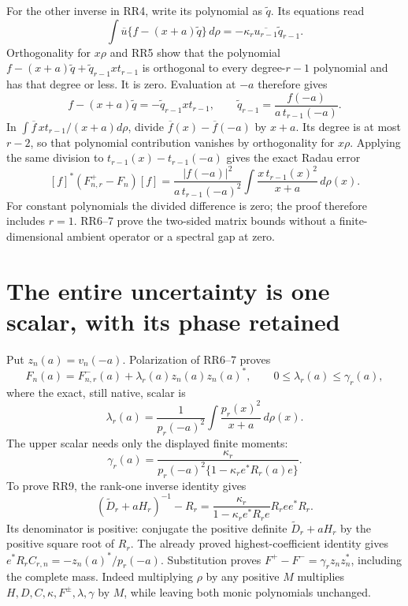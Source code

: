 \documentclass[11pt]{article}
\begin{document}
For the other inverse in RR4, write its polynomial as $\widetilde q$.
Its equations read
\[
 \int\overline u\{f-(x+a)\widetilde q\}\,d\rho
       =-\kappa_r\overline{u_{r-1}}\widetilde q_{r-1}.
\]
Orthogonality for $x\rho$ and RR5 show that the polynomial
$f-(x+a)\widetilde q+\widetilde q_{r-1}xt_{r-1}$ is orthogonal
to every degree-$r-1$ polynomial and has that degree or less.
It is zero. Evaluation at $-a$ therefore gives
\[
 f-(x+a)\widetilde q=-\widetilde q_{r-1}xt_{r-1},
 \qquad\widetilde q_{r-1}=\frac{f(-a)}{a\,t_{r-1}(-a)}.
\]
In $\int \overline f\,xt_{r-1}/(x+a)d\rho$, divide
$\overline f(x)-\overline f(-a)$ by $x+a$. Its degree is at
most $r-2$, so that polynomial contribution vanishes by
orthogonality for $x\rho$. Applying the same division to
$t_{r-1}(x)-t_{r-1}(-a)$ gives the exact Radau error
\begin{equation}\tag{RR7}\label{eq:RadauError}
 [f]^*(F^+_{n,r}-F_n)[f]
 =\frac{|f(-a)|^2}{a\,t_{r-1}(-a)^2}
               \int\frac{x\,t_{r-1}(x)^2}{x+a}\,d\rho(x).
\end{equation}
For constant polynomials the divided difference is zero; the proof
therefore includes $r=1$. RR6--7 prove the two-sided matrix bounds
without a finite-dimensional ambient operator or a spectral gap at zero.

\section{The entire uncertainty is one scalar, with its phase retained}
Put $z_n(a)=v_n(-a)$. Polarization of RR6--7 proves
\begin{equation}\tag{RR8}\label{eq:rankone}
 F_n(a)=F^-_{n,r}(a)+\lambda_r(a)z_n(a)z_n(a)^*,
 \qquad 0\le\lambda_r(a)\le\gamma_r(a),
\end{equation}
where the exact, still native, scalar is
\[
 \lambda_r(a)=\frac1{p_r(-a)^2}
                 \int\frac{p_r(x)^2}{x+a}\,d\rho(x).
\]
The upper scalar needs only the displayed finite moments:
\begin{equation}\tag{RR9}\label{eq:gamma}
 \gamma_r(a)=\frac{\kappa_r}
 {p_r(-a)^2\{1-\kappa_r e^*R_r(a)e\}}.
\end{equation}
To prove RR9, the rank-one inverse identity gives
\[
 (\widetilde D_r+aH_r)^{-1}-R_r
 =\frac{\kappa_r}{1-\kappa_r e^*R_re}R_ree^*R_r.
\]
Its denominator is positive: conjugate the positive definite
$\widetilde D_r+aH_r$ by the positive square root of $R_r$.
The already proved highest-coefficient identity gives
$e^*R_rC_{r,n}=-z_n(a)^*/p_r(-a)$.
Substitution proves $F^+-F^-=\gamma_rz_nz_n^*$, including the
complete mass. Indeed multiplying $\rho$ by any positive $M$
multiplies $H,D,C,\kappa,F^\pm,\lambda,\gamma$ by $M$,
while leaving both monic polynomials unchanged.
\end{document}
